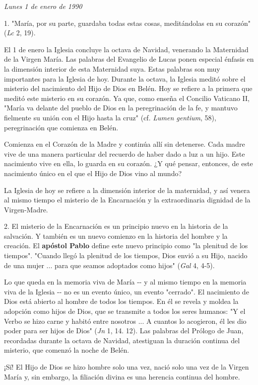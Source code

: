 \begin{body}
\emph{Lunes 1 de enero de 1990}

1. "María, por su parte, guardaba todas estas cosas, meditándolas en su corazón" (\emph{Lc} 2, 19).

El 1 de enero la Iglesia concluye la octava de Navidad, venerando la Maternidad de la Virgen María. Las palabras del Evangelio de Lucas ponen especial énfasis en la dimensión interior de esta Maternidad suya. Estas palabras son muy importantes para la Iglesia de hoy. Durante la octava, la Iglesia meditó sobre el misterio del nacimiento del Hijo de Dios en Belén. Hoy se refiere a la primera que meditó este misterio en su corazón. Ya que, como enseña el Concilio Vaticano II, "María va delante del pueblo de Dios en la peregrinación de la fe, y mantuvo fielmente su unión con el Hijo hasta la cruz" (cf. \emph{Lumen gentium}, 58), peregrinación que comienza en Belén.

Comienza en el Corazón de la Madre y continúa allí sin detenerse. Cada madre vive de una manera particular del recuerdo de haber dado a luz a un hijo. Este nacimiento vive en ella, lo guarda en su corazón. ¿Y qué pensar, entonces, de este nacimiento único en el que el Hijo de Dios vino al mundo?

La Iglesia de hoy se refiere a la dimensión interior de la maternidad, y así venera al mismo tiempo el misterio de la Encarnación y la extraordinaria dignidad de la Virgen-Madre.

2. El misterio de la Encarnación es un principio nuevo en la historia de la salvación. Y también es un nuevo comienzo en la historia del hombre y la creación. El \textbf{apóstol Pablo} define este nuevo principio como "la plenitud de los tiempos". "Cuando llegó la plenitud de los tiempos, Dios envió a su Hijo, nacido de una mujer ... para que seamos adoptados como hijos" (\emph{Gal} 4, 4-5).

Lo que queda en la memoria viva de María -\/- y al mismo tiempo en la memoria viva de la Iglesia -\/- no es un evento único, un evento "cerrado". El nacimiento de Dios está abierto al hombre de todos los tiempos. En él se revela y moldea la adopción como hijos de Dios, que se transmite a todos los seres humanos: "Y el Verbo se hizo carne y habitó entre nosotros ... A cuantos lo acogieron, él les dio poder para ser hijos de Dios" (\emph{Jn} 1, 14. 12). Las palabras del Prólogo de Juan, recordadas durante la octava de Navidad, atestiguan la duración continua del misterio, que comenzó la noche de Belén.

¡Sí! El Hijo de Dios se hizo hombre solo una vez, nació solo una vez de la Virgen María y, sin embargo, la filiación divina es una herencia continua del hombre.


\end{body}
